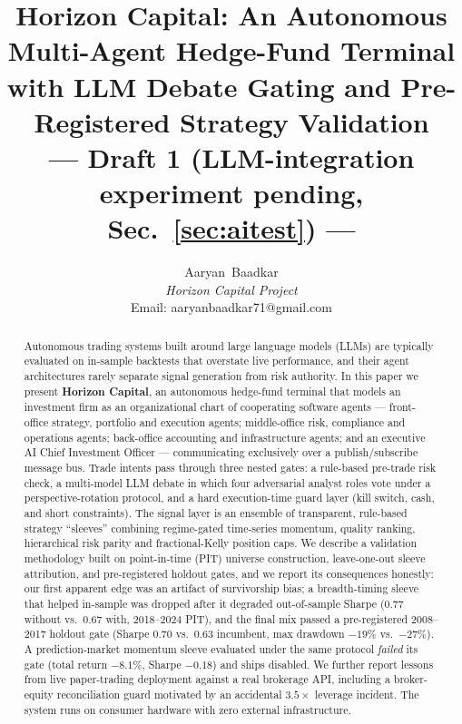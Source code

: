 \documentclass[10pt,twocolumn]{IEEEtran}
\begin{document}
\title{Horizon Capital: An Autonomous Multi-Agent Hedge-Fund Terminal with
LLM Debate Gating and Pre-Registered Strategy Validation\\
{\large --- Draft 1 (LLM-integration experiment pending, Sec.~\ref{sec:aitest}) ---}}

\author{Aaryan~Baadkar\\
\textit{Horizon Capital Project}\\
Email: aaryanbaadkar71@gmail.com}

\maketitle

\begin{abstract}
Autonomous trading systems built around large language models (LLMs) are
typically evaluated on in-sample backtests that overstate live performance,
and their agent architectures rarely separate signal generation from risk
authority. In this paper we present \textbf{Horizon Capital}, an autonomous
hedge-fund terminal that models an investment firm as an organizational chart
of cooperating software agents --- front-office strategy, portfolio and
execution agents; middle-office risk, compliance and operations agents;
back-office accounting and infrastructure agents; and an executive AI Chief
Investment Officer --- communicating exclusively over a publish/subscribe
message bus. Trade intents pass through three nested gates: a rule-based
pre-trade risk check, a multi-model LLM debate in which four adversarial
analyst roles vote under a perspective-rotation protocol, and a hard
execution-time guard layer (kill switch, cash, and short constraints).
The signal layer is an ensemble of transparent, rule-based strategy
``sleeves'' combining regime-gated time-series momentum, quality ranking,
hierarchical risk parity and fractional-Kelly position caps. We describe a
validation methodology built on point-in-time (PIT) universe construction,
leave-one-out sleeve attribution, and pre-registered holdout gates, and we
report its consequences honestly: our first apparent edge was an artifact of
survivorship bias; a breadth-timing sleeve that helped in-sample was dropped
after it degraded out-of-sample Sharpe (0.77 without vs.\ 0.67 with, 2018--2024
PIT), and the final mix passed a pre-registered 2008--2017 holdout gate
(Sharpe 0.70 vs.\ 0.63 incumbent, max drawdown $-19\%$ vs.\ $-27\%$). A
prediction-market momentum sleeve evaluated under the same protocol
\emph{failed} its gate (total return $-8.1\%$, Sharpe $-0.18$) and ships
disabled. We further report lessons from live paper-trading deployment
against a real brokerage API, including a broker-equity reconciliation guard
motivated by an accidental $3.5\times$ leverage incident. The system runs on
consumer hardware with zero external infrastructure.
\end{abstract}
\end{document}
